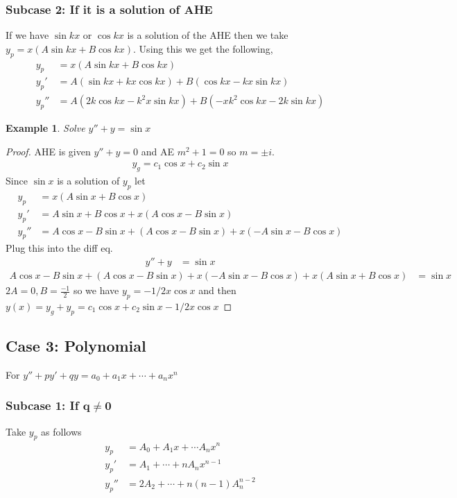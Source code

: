 \documentclass[oneside,11pt,pdftex,final]{book}%
\numberwithin{equation}{section}
\newtheorem{example}[theorem]{Example}
\numberwithin{section}{chapter}
\numberwithin{equation}{chapter}
\begin{document}
\subsubsection{Subcase 2: If it is a solution of AHE}
If we have $ \sin kx  $ or $ \cos kx  $ is a solution of the AHE then we take $ y_p=x(A \sin kx + B \cos kx) $. Using this we get the following,
\begin{align*}
	y_p&=x(A \sin kx + B \cos kx)\\
	y_p'&=A(\sin kx + kx \cos kx)+B(\cos kx - kx \sin kx)\\
	y_p''&=A(2k \cos kx - k^2 x \sin kx)+B(-x k^2 \cos kx - 2k \sin kx)
\end{align*}
\begin{example}
	Solve $ y''+y=\sin x $
\end{example}
\begin{proof}
	AHE is given $ y''+y=0 $ and AE $ m^2+1=0 $ so $ m=\pm i $.
	\begin{align*}
		y_g=c_1\cos x + c_2 \sin  x
	\end{align*}
Since $ \sin x $ is a solution of $ y_p $ let 
\begin{align*}
	 y_p&=x(A \sin x + B \cos x) \\
	 y_p'&=A \sin x + B \cos x + x (A \cos x - B \sin x)\\
	 y_p''&= A \cos x - B \sin x + (A \cos x - B \sin x)+ x(-A \sin x - B \cos x)
\end{align*}
Plug this into the diff eq.
\begin{align*}
	y''+y&=\sin x
\end{align*}
\begin{align*}
	A \cos x - B \sin x + (A \cos x - B \sin x)+ x(-A \sin x - B \cos x) + x(A \sin x + B \cos x)&= \sin x
\end{align*}
$ 2A=0, B=\frac{-1}{2} $ so we have $ y_p=-1/2 x \cos x $ and then $ y(x)=y_g+y_p=c_1\cos x + c_2 \sin x - 1/2 x \cos x  $
\end{proof}



\subsection{Case 3: Polynomial}
For $ y''+py'+qy=a_0+a_1x+\cdots+a_nx^n $
\subsubsection{Subcase 1: If $ \mathbf{q\neq0} $}
Take $ y_p $ as follows
\begin{align*}
	y_p&=A_0+A_1x+\cdots A_nx^n\\
	y_p'&=A_1+\cdots+n A_nx^{n-1}\\
	y_p''&=2A_2+\cdots+n(n-1)A_n^{n-2}
\end{align*}
\end{document}
